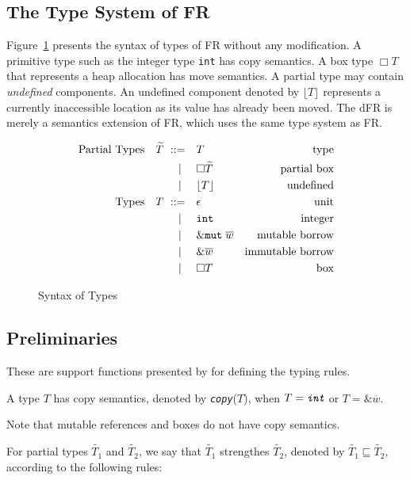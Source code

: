 \newpage
\begin{subappendices}
\section{The Type System of FR}
\label{chap3:app1:type-system}
Figure~\ref{chap3:app1:type-system:syntax} presents the syntax of types of  FR without any modification. A primitive type such as the integer type \texttt{int} has copy semantics. A box type $\Box T$ that represents a heap allocation has move semantics. A partial type may contain \emph{undefined} components. An undefined component denoted by $\lfloor T \rfloor$ represents a currently inaccessible location as its value has already been moved. The dFR is merely a semantics extension of FR, which uses the same type system as FR.
\begin{figure}
    \centering
    \begin{align*}
    \text{Partial Types}\quad \widetilde{T}\ \metaDeff \quad &T &\text{type}\\
    \cmid \quad &\Box \widetilde{T} &\text{partial box}\\
    \cmid \quad &\lfloor T \rfloor &\text{undefined}\\
    \text{Types}\quad T\ \metaDeff \quad &\epsilon &\text{unit}\\
    \cmid \quad &\texttt{int} &\text{integer}\\
    \cmid \quad &\&\texttt{mut}\; \overline{w} &\text{mutable borrow}\\
    \cmid \quad &\&\overline{w} &\text{immutable borrow}\\
    \cmid \quad &\Box T&\text{box}
    \end{align*}
    \caption{Syntax of Types}
    \label{chap3:app1:type-system:syntax}
\end{figure}
\subsection{Preliminaries}
These are support functions presented by \citet{10.1145/3443420} for defining the typing rules.
\begin{definition} A type $T$ has copy semantics, denoted by \emph{\texttt{copy}}($T$), when $T = \emph{\texttt{int}}$ or $T = \&\overline{w}$.
\end{definition}
\noindent Note that mutable references and boxes do not have copy semantics.
\begin{definition} For partial types $\widetilde{T_1}$ and $\widetilde{T_2}$, we say that $\widetilde{T_1}$ strengthes $\widetilde{T_2}$, denoted by $\widetilde{T_1} \sqsubseteq \widetilde{T_2}$, according to the following rules:
\end{definition}
\vspace{-2.0em}
\begin{mathpar}
    

\end{mathpar}
\end{subappendices}
